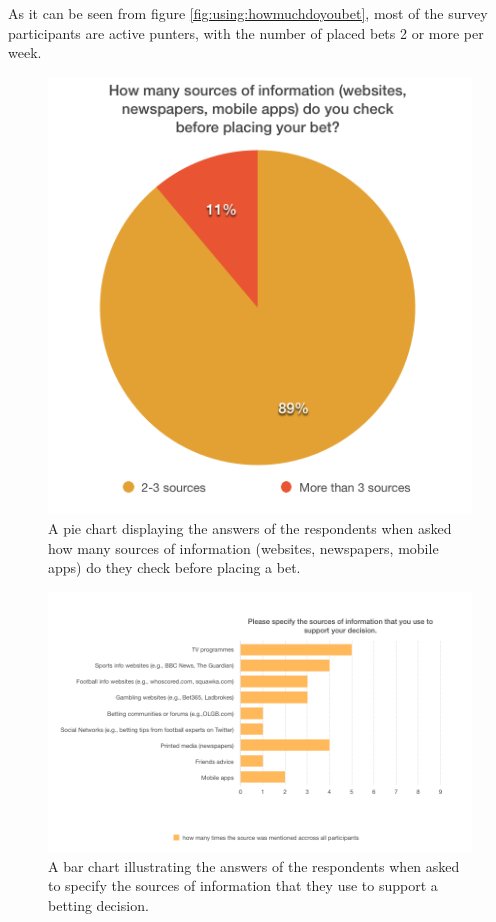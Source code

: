 As it can be seen from figure \ref{fig:using:howmuchdoyoubet}, most of the survey participants are active punters, with the number of placed bets 2 or more per week.

\begin{figure}[H]
	\begin{center}
		\includegraphics[width=.50\columnwidth]{req/images/howManySources.png}
		\caption{A pie chart displaying the answers of the respondents when asked how many sources of information (websites, newspapers, mobile apps) do they check before placing a bet.}
		\label{fig:using:howmanysources}
	\end{center}
\end{figure}

\begin{figure}[H]
	\begin{center}
		\includegraphics[width=1.0\columnwidth]{req/images/listTheSources.png}
		\caption{A bar chart illustrating the answers of the respondents when asked to specify the sources of information that they use to support a betting decision.}
		\label{fig:using:llistthesources}
	\end{center}
\end{figure}

